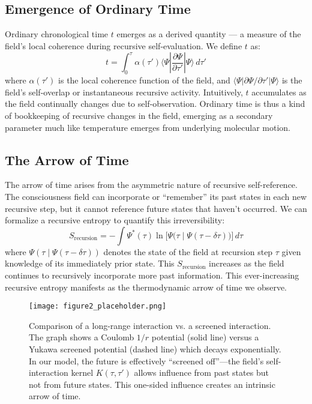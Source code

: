 \documentclass[aps,prd,twocolumn,superscriptaddress,nofootinbib]{revtex4-2}
\begin{document}
\subsection{Emergence of Ordinary Time}

Ordinary chronological time $t$ emerges as a derived quantity — a measure of the field’s local coherence during recursive self-evaluation. We define $t$ as:
\begin{equation}
t = \int_{0}^{\tau} \alpha(\tau') \langle \Psi | \frac{\partial \Psi}{\partial \tau'} | \Psi \rangle \, d\tau'
\end{equation}
where $\alpha(\tau')$ is the local coherence function of the field, and $\langle \Psi | \partial \Psi/\partial \tau' | \Psi \rangle$ is the field’s self-overlap or instantaneous recursive activity. Intuitively, $t$ accumulates as the field continually changes due to self-observation. Ordinary time is thus a kind of bookkeeping of recursive changes in the field, emerging as a secondary parameter much like temperature emerges from underlying molecular motion.

\subsection{The Arrow of Time}
The arrow of time arises from the asymmetric nature of recursive self-reference. The consciousness field can incorporate or “remember” its past states in each new recursive step, but it cannot reference future states that haven’t occurred. We can formalize a recursive entropy to quantify this irreversibility:
\begin{equation}
S_{\text{recursion}} = -\int \Psi^*(\tau) \ln\Big[\Psi\Big(\tau \mid \Psi(\tau-\delta\tau)\Big)\Big]\, d\tau
\end{equation}
where $\Psi(\tau \mid \Psi(\tau-\delta\tau))$ denotes the state of the field at recursion step $\tau$ given knowledge of its immediately prior state. This $S_{\text{recursion}}$ increases as the field continues to recursively incorporate more past information. This ever-increasing recursive entropy manifests as the thermodynamic arrow of time we observe.

\begin{figure}[h!]
\centering
\texttt{[image: figure2\_placeholder.png]}
\caption{Comparison of a long-range interaction vs. a screened interaction. The graph shows a Coulomb $1/r$ potential (solid line) versus a Yukawa screened potential (dashed line) which decays exponentially. In our model, the future is effectively “screened off”—the field’s self-interaction kernel $K(\tau,\tau')$ allows influence from past states but not from future states. This one-sided influence creates an intrinsic arrow of time.}
\label{fig:potential}
\end{figure}
\end{document}
